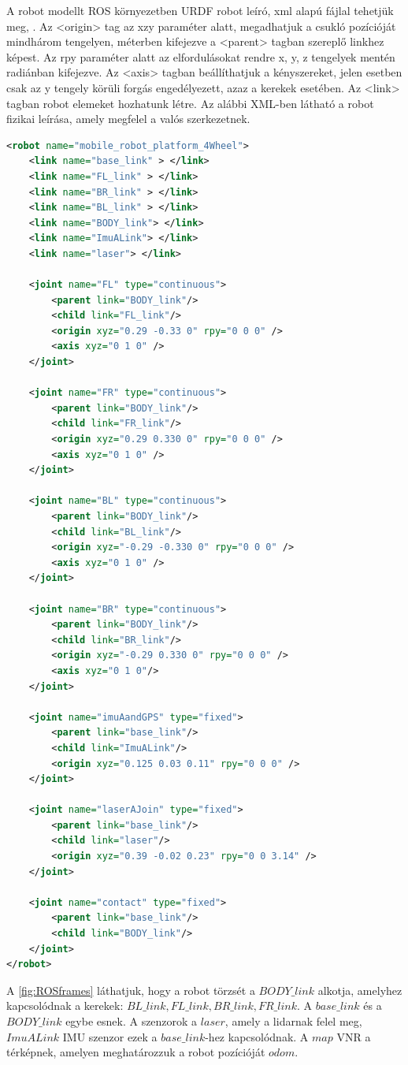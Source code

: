 A robot modellt ROS környezetben URDF robot leíró, xml alapú fájlal tehetjük meg, \cite{rosURDF}
\cite{rosJoint} \cite{rosLink}.
Az <origin> tag az xzy paraméter alatt, megadhatjuk a csukló pozícióját mindhárom tengelyen, méterben kifejezve a <parent> tagban szereplő linkhez képest. Az rpy paraméter alatt az elfordulásokat rendre x, y, z tengelyek mentén radiánban kifejezve.
Az <axis> tagban beállíthatjuk a kényszereket, jelen esetben csak az y tengely körüli forgás engedélyezett, azaz a kerekek esetében. 
Az <link> tagban robot elemeket hozhatunk létre. Az alábbi XML-ben látható a robot fizikai leírása, amely megfelel a valós szerkezetnek.
\begin{lstlisting}[language=XML]
<robot name="mobile_robot_platform_4Wheel">
	<link name="base_link" > </link>
	<link name="FL_link" > </link>
	<link name="BR_link" > </link>
	<link name="BL_link" > </link>
	<link name="BODY_link"> </link>  
	<link name="ImuALink"> </link>  
	<link name="laser"> </link> 

	<joint name="FL" type="continuous">
		<parent link="BODY_link"/>
		<child link="FL_link"/>    
		<origin xyz="0.29 -0.33 0" rpy="0 0 0" />
		<axis xyz="0 1 0" />
	</joint>

	<joint name="FR" type="continuous">
		<parent link="BODY_link"/>
		<child link="FR_link"/>    
		<origin xyz="0.29 0.330 0" rpy="0 0 0" />
		<axis xyz="0 1 0" />
	</joint>

	<joint name="BL" type="continuous">
		<parent link="BODY_link"/>
		<child link="BL_link"/>
		<origin xyz="-0.29 -0.330 0" rpy="0 0 0" />
		<axis xyz="0 1 0" />
	</joint>

	<joint name="BR" type="continuous">
		<parent link="BODY_link"/>
		<child link="BR_link"/>     
		<origin xyz="-0.29 0.330 0" rpy="0 0 0" />
		<axis xyz="0 1 0"/>
	</joint>

	<joint name="imuAandGPS" type="fixed">
		<parent link="base_link"/>
		<child link="ImuALink"/>
		<origin xyz="0.125 0.03 0.11" rpy="0 0 0" />
	</joint>

	<joint name="laserAJoin" type="fixed">
		<parent link="base_link"/>
		<child link="laser"/>
		<origin xyz="0.39 -0.02 0.23" rpy="0 0 3.14" />
	</joint>  

	<joint name="contact" type="fixed">
		<parent link="base_link"/>
		<child link="BODY_link"/>
	</joint> 
</robot>
\end{lstlisting}

A \ref{fig:ROSframes} láthatjuk, hogy a robot törzsét a $BODY\_link$ alkotja, amelyhez kapcsolódnak a kerekek: $BL\_link,FL\_link,BR\_link,FR\_link$. A $base\_link$ és a $BODY\_link$ egybe esnek. A szenzorok a $laser$, amely a lidarnak felel meg, $ImuALink$ IMU szenzor ezek a $base\_link$-hez kapcsolódnak.
A $map$ VNR a térképnek, amelyen meghatározzuk a robot pozícióját $odom$.

\renewcommand{\img}{SajatRobot/ROS/frames.svg}
\renewcommand{\sources}{*}
\renewcommand{\svg}{svg}
\renewcommand{\aspectratioPic}{1.5}
\renewcommand{\rotationAnglePic}{90}
\renewcommand{\captionn}{A megvalósított robot VNR-k közti reláció }
\renewcommand{\figlabel}{ROSframes}




